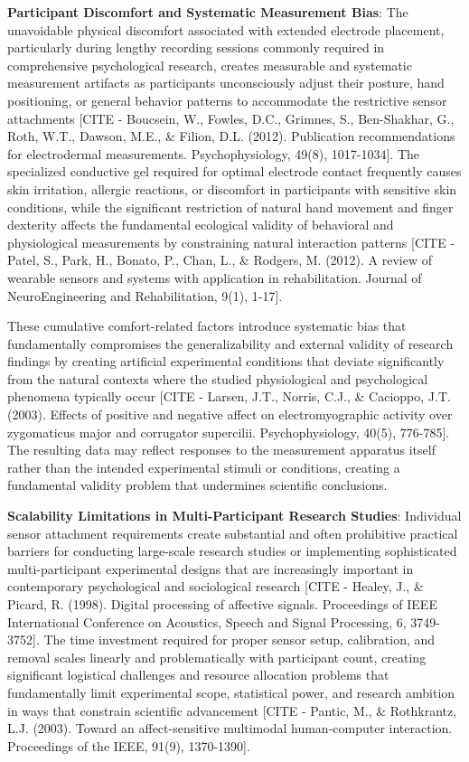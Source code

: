 \documentclass[11pt,a4paper]{report}
\begin{document}
\textbf{Participant Discomfort and Systematic Measurement Bias}: The unavoidable physical discomfort associated with extended
electrode placement, particularly during lengthy recording sessions commonly required in comprehensive psychological
research, creates measurable and systematic measurement artifacts as participants unconsciously adjust their posture,
hand positioning, or general behavior patterns to accommodate the restrictive sensor
attachments [CITE - Boucsein, W., Fowles, D.C., Grimnes, S., Ben-Shakhar, G., Roth, W.T., Dawson, M.E., \& Filion, D.L. (2012). Publication recommendations for electrodermal measurements. Psychophysiology, 49(8), 1017-1034].
The specialized conductive gel required for optimal electrode contact frequently causes skin irritation, allergic
reactions, or discomfort in participants with sensitive skin conditions, while the significant restriction of natural
hand movement and finger dexterity affects the fundamental ecological validity of behavioral and physiological
measurements by constraining natural interaction
patterns [CITE - Patel, S., Park, H., Bonato, P., Chan, L., \& Rodgers, M. (2012). A review of wearable sensors and systems with application in rehabilitation. Journal of NeuroEngineering and Rehabilitation, 9(1), 1-17].

These cumulative comfort-related factors introduce systematic bias that fundamentally compromises the generalizability
and external validity of research findings by creating artificial experimental conditions that deviate significantly
from the natural contexts where the studied physiological and psychological phenomena typically
occur [CITE - Larsen, J.T., Norris, C.J., \& Cacioppo, J.T. (2003). Effects of positive and negative affect on electromyographic activity over zygomaticus major and corrugator supercilii. Psychophysiology, 40(5), 776-785].
The resulting data may reflect responses to the measurement apparatus itself rather than the intended experimental
stimuli or conditions, creating a fundamental validity problem that undermines scientific conclusions.

\textbf{Scalability Limitations in Multi-Participant Research Studies}: Individual sensor attachment requirements create
substantial and often prohibitive practical barriers for conducting large-scale research studies or implementing
sophisticated multi-participant experimental designs that are increasingly important in contemporary psychological and
sociological
research [CITE - Healey, J., \& Picard, R. (1998). Digital processing of affective signals. Proceedings of IEEE International Conference on Acoustics, Speech and Signal Processing, 6, 3749-3752].
The time investment required for proper sensor setup, calibration, and removal scales linearly and problematically with
participant count, creating significant logistical challenges and resource allocation problems that fundamentally limit
experimental scope, statistical power, and research ambition in ways that constrain scientific
advancement [CITE - Pantic, M., \& Rothkrantz, L.J. (2003). Toward an affect-sensitive multimodal human-computer interaction. Proceedings of the IEEE, 91(9), 1370-1390].
\end{document}
